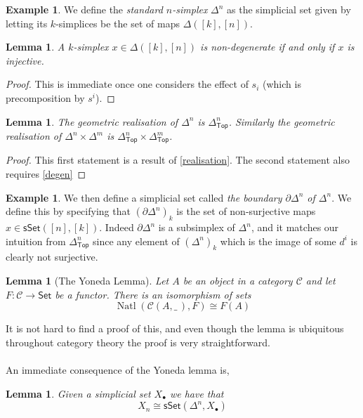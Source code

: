 \documentclass{amsart}
\DeclareMathOperator{\Top}{\mathsf{Top}}
\DeclareMathOperator{\Natl}{Natl}
\newtheorem{lemma}[theorem]{Lemma}
\theoremstyle{definition}
\newtheorem{example}[theorem]{Example}
\begin{document}
\begin{example}
  We define the \textit{standard $n$-simplex} $\Delta^n$ as the simplicial set
  given by letting its $k$-simplices be the set of maps $\Delta([k],[n])$.
\end{example}

\begin{lemma}
  A $k$-simplex $x\in \Delta([k],[n])$ is non-degenerate if and only if
  $x$ is injective.
\end{lemma}
\begin{proof}
  This is immediate once one considers the effect of
  $s_i$ (which is precomposition by $s^i$).
\end{proof}
\begin{lemma}\label{delreal}
  The geometric realisation of $\Delta^n$ is $\Delta^n_{\Top}$. Similarly
  the geometric realisation of $\Delta^n\times \Delta^m$ is
  $\Delta^n_{\Top}\times \Delta^m_{\Top}$.
\end{lemma}
\begin{proof}
  This first statement is a result of \ref{realisation}. The second statement
  also requires \ref{degen}
\end{proof}

\begin{example}
We then define a simplicial set called \textit{the boundary $\partial\Delta^n$
of $\Delta^n$}. We define this by specifying that
$(\partial \Delta^n)_k$ is the set of non-surjective maps
$x\in \mathsf{sSet}([n],[k])$. Indeed $\partial \Delta^n$ is a subsimplex
of $\Delta^n$, and it matches our intuition from
$\Delta_{\Top}^n$ since any element of $(\Delta^n)_k$ which is the image of
some $d^i$ is clearly not surjective. 
\end{example}
\begin{lemma}[The Yoneda Lemma]
  Let $A$ be an object in a category $\mathcal{C}$ and let
  $F: \mathcal{C}\to \mathsf{Set}$ be a functor.
  There is an isomorphism of sets
  $$
  \Natl\left(\mathcal{C}(A,\_ \,), F\right)\cong F(A)
  $$
\end{lemma}
It is not hard to find a proof of this, and even though the lemma
is ubiquitous throughout category theory the proof is very straightforward.
\\
\\
\indent
An immediate consequence of the Yoneda lemma is,
\begin{lemma}
  Given a simplicial set $X_\bullet$ we have that
  $$
  X_n\cong \mathsf{sSet}(\Delta^n, X_\bullet)
  $$
\end{lemma}
\end{document}
